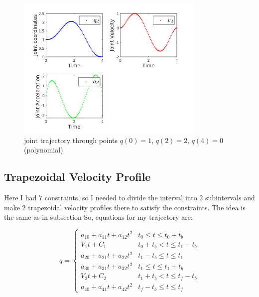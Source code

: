 \documentclass[12pt, a4paper]{report}
\begin{document}
\begin{figure}[H]
	\centering
		\includegraphics[width=0.8\textwidth]{21} %
	\caption{joint trajectory through points $q(0) = 1$, $q(2) = 2$, $q(4) = 0$ (polynomial)} %
	\label{fig:mesh5}
\end{figure}

{\centering
\subsection*{Trapezoidal Velocity Profile}
}
%

Here I had 7 constraints, so I needed to divide the interval into 2 subintervals and make 2 trapezoidal velocity profiles there to satisfy the constraints. The idea is the same as in subsection 
So, equations for my trajectory are:

\begin{equation}
q = \begin{cases} 
      a_{10} + a_{11}t + a_{12}t^2 & t_0 \leq t \leq t_0 + t_b \\
      V_1t + C_1 & t_0 + t_b < t \leq t_1 - t_b \\
      a_{20} + a_{21}t + a_{22}t^2 & t_1 - t_b \leq t \leq t_1 \\
      a_{30} + a_{31}t + a_{32}t^2 & t_1 \leq t \leq t_1 + t_b \\
      V_2t + C_2 & t_1 + t_b < t \leq t_f - t_b \\
      a_{40} + a_{41}t + a_{42}t^2 & t_f - t_b \leq t \leq t_f 

\end{cases}
\end{equation}
\end{document}
